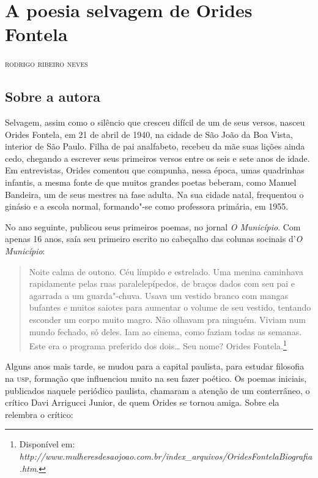 \chapter{A poesia selvagem de Orides Fontela}

\begin{flushright}
\textsc{rodrigo ribeiro neves}
\end{flushright}
\bigskip

\section{Sobre a autora}

\noindent{}Selvagem, assim como o silêncio que cresceu difícil de um de seus
versos, nasceu Orides Fontela, em 21 de abril de 1940, na cidade de São
João da Boa Vista, interior de São Paulo. Filha de pai analfabeto,
recebeu da mãe suas lições ainda cedo, chegando a escrever seus
primeiros versos entre os seis e sete anos de idade. Em entrevistas,
Orides comentou que compunha, nessa época, umas quadrinhas infantis, a
mesma fonte de que muitos grandes poetas beberam, como Manuel Bandeira,
um de seus mestres na fase adulta. Na sua cidade natal, frequentou o
ginásio e a escola normal, formando"-se como professora primária, em
1955.

No ano seguinte, publicou seus primeiros poemas, no jornal \emph{O
Município}. Com apenas 16 anos, saía seu primeiro escrito no cabeçalho das colunas socinais d'\emph{O Município}:

\begin{quote}
Noite calma de outono. Céu límpido e estrelado. Uma menina caminhava rapidamente pelas ruas paralelepípedos, de braços dados com seu pai e agarrada a um guarda"-chuva. Usava um vestido branco com mangas bufantes e muitos saiotes para aumentar o volume de seu vestido, tentando esconder um corpo muito magro. Não olhavam pra ninguém. Viviam num mundo fechado, só deles. Iam ao cinema, como faziam todas as semanas. Este era o programa preferido dos dois\ldots{} Seu nome? Orides Fontela.\footnote{Disponível em: \emph{http://www.mulheresdesaojoao.com.br/index\_arquivos/OridesFontelaBiografia.htm}.}
\end{quote}

Alguns anos mais tarde, se mudou para a capital paulista,
para estudar filosofia na \textsc{usp}, formação que influenciou muito na seu
fazer poético. Os poemas iniciais, publicados naquele periódico
paulista, chamaram a atenção de um conterrâneo, o crítico Davi Arrigucci
Junior, de quem Orides se tornou amiga. Sobre ela relembra o crítico:

